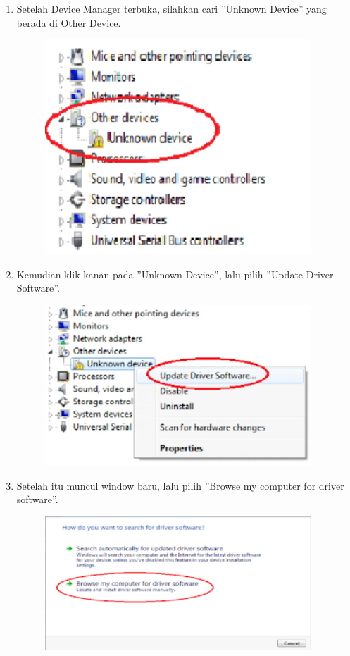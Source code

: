 \begin{enumerate}
\begin{figure}[H]
		\centering
	\end{figure}
	\item Setelah Device Manager terbuka, silahkan cari ''Unknown Device'' yang berada di Other Device.
	\begin{figure}[H]
		\includegraphics[width=10cm]{figures/5/1174006/Teori/4.png}
		\centering
	\end{figure}
	\item Kemudian klik kanan pada ''Unknown Device'', lalu pilih ''Update Driver Software''.
	\begin{figure}[H]
		\includegraphics[width=10cm]{figures/5/1174006/Teori/5.png}
		\centering
	\end{figure}
	\item Setelah itu muncul window baru, lalu pilih ''Browse my computer for driver software''.
	\begin{figure}[H]
		\includegraphics[width=10cm]{figures/5/1174006/Teori/6.png}

\end{figure}
\end{enumerate}
